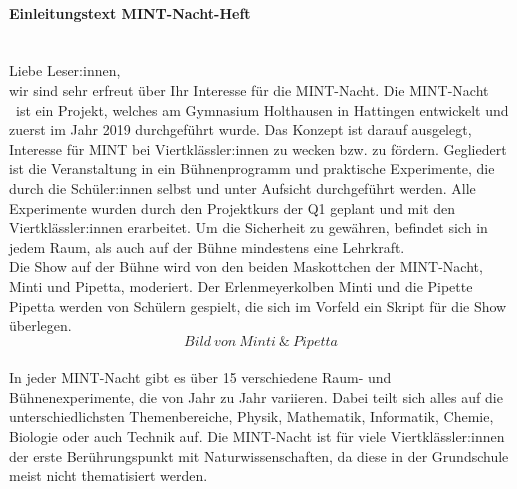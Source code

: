 \documentclass[12pt,a4paper]{report}
\newcommand{\gen}[0]{:innen }
\newcommand{\gens}[0]{:innen}
\newcommand{\mn}[0]{MINT-Nacht }
\newcommand{\mns}[0]{MINT-Nacht}
\begin{document}
	\thispagestyle{empty}
	\noindent
	\large
	\paragraph{Einleitungstext MINT-Nacht-Heft} \mbox{} \\[0.5cm]
	Liebe Leser\gens, \\
	wir sind sehr erfreut über Ihr Interesse für die \mns.
	Die \mn\ ist ein Projekt, welches am Gymnasium Holthausen in Hattingen entwickelt und zuerst im Jahr 2019 durchgeführt wurde.
	Das Konzept ist darauf ausgelegt, Interesse für MINT bei Viertklässler\gen zu wecken bzw. zu fördern.
	Gegliedert ist die Veranstaltung in ein Bühnenprogramm und praktische Experimente, die durch die Schüler\gen selbst und unter Aufsicht durchgeführt werden.
	Alle Experimente wurden durch den Projektkurs der Q1 geplant und mit den Viertklässler\gen erarbeitet.
	Um die Sicherheit zu gewähren, befindet sich in jedem Raum, als auch auf der Bühne mindestens eine Lehrkraft.
	\\
	Die Show auf der Bühne wird von den beiden Maskottchen der \mns, Minti und Pipetta, moderiert.
	Der Erlenmeyerkolben Minti und die Pipette Pipetta werden von Schülern gespielt, die sich im Vorfeld ein Skript für die Show überlegen.
	\\
	\[Bild\ von \ Minti\ \&\ Pipetta\]
	\\
	In jeder \mn gibt es über 15 verschiedene Raum- und Bühnenexperimente, die von Jahr zu Jahr variieren.
	Dabei teilt sich alles auf die unterschiedlichsten Themenbereiche, Physik, Mathematik, Informatik, Chemie, Biologie oder auch Technik auf.
	Die \mn ist für viele Viertklässler\gen der erste Berührungspunkt mit Naturwissenschaften, da diese in der Grundschule meist nicht thematisiert werden.
	
\end{document}
